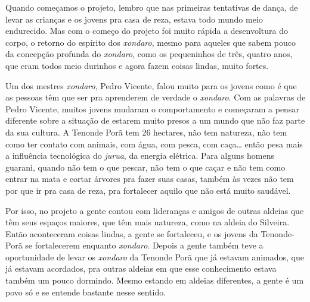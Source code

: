 Quando começamos o projeto, lembro que nas primeiras tentativas de
dança, de levar as crianças e os jovens pra casa de reza, estava todo
mundo meio endurecido. Mas com o começo do projeto foi muito rápida a
desenvoltura do corpo, o retorno do espírito dos \emph{xondaro}, mesmo para
aqueles que sabem pouco da concepção profunda do \emph{xondaro}, como os
pequeninhos de três, quatro anos, que eram todos meio durinhos e agora
fazem coisas lindas, muito fortes. 

Um dos mestres \emph{xondaro}, Pedro Vicente, falou muito para os jovens como é
que as pessoas têm que ser pra aprenderem de verdade o \emph{xondaro}. Com as
palavras de Pedro Vicente, muitos jovens mudaram o comportamento e
começaram a pensar diferente sobre a situação de estarem muito presos a
um mundo que não faz parte da sua cultura. A Tenonde Porã tem 26
hectares, não tem natureza, não tem como ter contato com animais, com
água, com pesca, com caça\ldots{} então pesa mais a influência tecnológica
do \emph{jurua}, da energia elétrica. Para alguns homens guarani, quando não
tem o que pescar, não tem o que caçar e não tem como entrar na mata e
cortar árvores pra fazer suas casas, também às vezes não tem por que ir
pra casa de reza, pra fortalecer aquilo que não está muito saudável.

Por isso, no projeto a gente contou com lideranças e amigos de outras
aldeias que têm seus espaços maiores, que têm mais natureza, como na
aldeia do Silveira. Então aconteceram coisas lindas, a gente se
fortaleceu, e os jovens da Tenonde-Porã se fortalecerem enquanto
\emph{xondaro}. Depois a gente também teve a oportunidade de levar os \emph{xondaro}
da Tenonde Porã que já estavam animados, que já estavam acordados, pra
outras aldeias em que esse conhecimento estava também um pouco
dormindo. Mesmo estando em aldeias diferentes, a gente é um povo só e
se entende bastante nesse sentido.

